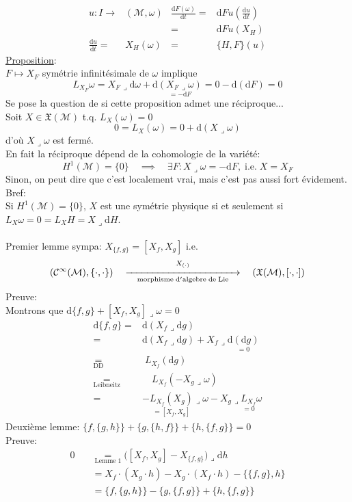 \documentclass[a4paper,11pt]{article}
\renewcommand{\d}{{\mathrm{d}}}
\begin{document}
\begin{align*}
u : I \to& (\mathcal{M},\omega) &\frac{\d F(\omega)}{\d t} =& \d F u\left(\frac{\d u}{\d t}\right)\\
&&=& \d F u(X_H)\\
\frac{\d u}{\d t} =& X_H(\omega)
& =& \{H,F\}(u)
\end{align*}
\underline{Proposition}:\\
$F\mapsto X_F$ symétrie infinitésimale de $\omega$ implique
$$L_{X_F}\omega = X_F \lrcorner\d \omega + \d \underset{=-\d F}{\left(X_F\lrcorner \omega\right)}=0 - \d(\d F) = 0$$
Se pose la question de si cette proposition admet une réciproque...\\
Soit $X\in \mathfrak{X}(\mathcal{M})$ t.q. $L_X(\omega)=0$
$$0=L_X(\omega)=0+\d (X\lrcorner\omega)$$
d'où $X\lrcorner\omega$ est fermé.\\
En fait la réciproque dépend de la cohomologie de la variété:
$$H^1(\mathcal{M})=\{0\} \quad \implies \quad \exists F : X\lrcorner\omega = - \d F, \; \mathrm{i}.\mathrm{e}. \; X=X_F$$
Sinon, on peut dire que c'est localement vrai, mais c'est pas aussi fort évidement. Bref:\\
Si $H^1(\mathcal{M})=\{0\}$, $X$ est une symétrie physique si et seulement si $L_X\omega = 0 = L_XH=X\lrcorner\d H$.\\
\\
Premier lemme sympa: $X_{\{f,g\}}=[X_f,X_g]$ i.e.
$$\left(\mathcal{C}^\infty(\mathcal{M}), \{\cdot,\cdot\}\right) \quad \overset{X_{(\cdot)}}{\underset{\mathrm{morphisme}\;\d '\mathrm{algebre}\;\mathrm{de}\;\mathrm{Lie}}{\xrightarrow{\hspace*{4cm}}}} \quad \left(\mathfrak{X}(\mathcal{M}),[\cdot,\cdot]\right)$$
Preuve:\\
Montrons que $\d \{f,g\} + [X_f,X_g]\lrcorner\omega = 0$
\begin{align*}
\d \{f,g\} =& \d \left(X_f \lrcorner\d g\right)\\
=& \d \left(X_f\lrcorner\d g\right)+ X_f \lrcorner\underset{=0}{\d(\d g)}\\
\underset{\mathrm{DD}}=\!\!&\;L_{X_f}(\d g)\\
\underset{\mathrm{Leibneitz}}=\!\!\!\!\!\!\!\!&\quad L_{X_f}(-X_g\lrcorner\omega)\\
=&-\underset{=[X_f,X_g]}{L_{X_f}(X_g)}\lrcorner\omega-X_g\lrcorner \underset{=0}{L_{X_f}}\omega
\end{align*}
Deuxième lemme: $\{f,\{g,h\}\}+\{g,\{h,f\}\}+\{h,\{f,g\}\}=0$\\
Preuve:
\begin{align*}
0\quad&\!\!\!\!\!\!\!\underset{\mathrm{Lemme}\;1}= \Big([X_f,X_g]-X_{\{f,g\}}\Big)\lrcorner\d h\\
&= X_f \cdot (X_g\cdot h) - X_g \cdot (X_f \cdot h) - \{\{f,g\},h\}\\
&= \{f,\{g,h\}\} - \{g,\{f,g\}\}+\{h,\{f,g\}\} 
\end{align*}
\end{document}
